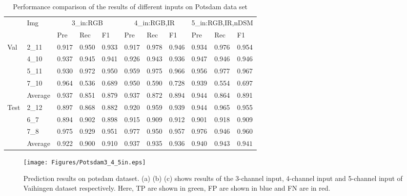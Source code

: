 \begin{table}[htbp]
    \caption {Performance comparison of the results of different inputs on Potsdam data set}
    \begin{center}
    \begin{tabular}{p{1.1cm}<{\centering}|p{1.1cm}<{\centering}|p{1.1cm}<{\centering}|p{1.1cm}<{\centering}|p{1.1cm}<{\centering}|p{1.1cm}<{\centering}|p{1.1cm}<{\centering}|p{1.1cm}<{\centering}|p{1.1cm}<{\centering}|p{1.1cm}<{\centering}|p{1.1cm}<{\centering}}
     \hline
    &\multirow{2}{*}{Img}&\multicolumn{3}{c}{3\_in:RGB} &\multicolumn{3}{|c|}{4\_in:RGB,IR}&\multicolumn{3}{c}{5\_in:RGB,IR,nDSM}\\
     \cline{3-11}
    && Pre &Rec & F1 &Pre &Rec &F1&Pre &Rec &F1\\
    \hline\hline
    \multirow{4}{*}{Val}&2\_11&0.917&0.950&0.933&0.917&0.978&0.946&0.934&0.976&0.954\\
    &4\_10&0.937&0.945&0.941&0.926&0.943&0.936&0.947&0.946&0.946\\
    &5\_11&0.930&0.972&0.950&0.959&0.975&0.966&0.956&0.977&0.967\\
    &7\_10&0.964&0.536&0.689&0.950&0.590&0.728&0.939&0.554&0.697\\
    \cline{2-11}
    &{Average}&0.937&0.851&0.879&0.937&$\bm{0.872}$&$\bm{0.894}$&$\bm{0.944}$&0.864&0.891\\
    \hline\hline
    \multirow{3}{*}{Test}&2\_12&0.897&0.868&0.882&0.920&0.959&0.939&0.944&0.965&0.955\\
    &6\_7&0.894&0.902&0.898&0.915&0.909&0.912&0.901&0.918&0.909\\
    &7\_8&0.975&0.929&0.951&0.977&0.950&0.957&0.976&0.946&0.960\\
    \cline{2-11}
    &{Average}&0.922&0.900&0.910&0.937&0.935&0.936&$\bm{0.940}$&$\bm{0.943}$&$\bm{0.941}$\\
    \hline\hline
   \end{tabular}
   \end{center}
   \end{table}

\begin{figure}
\centering
\texttt{[image: Figures/Potsdam3\_4\_5in.eps]}
\caption{Prediction results on potsdam dataset. (a) (b) (c) shows results of the 3-channel input, 4-channel input and 5-channel input of Vaihingen dataset respectively. Here, TP are shown in green, FP are shown in blue and FN are in red.}
\label{17}
\end{figure}

